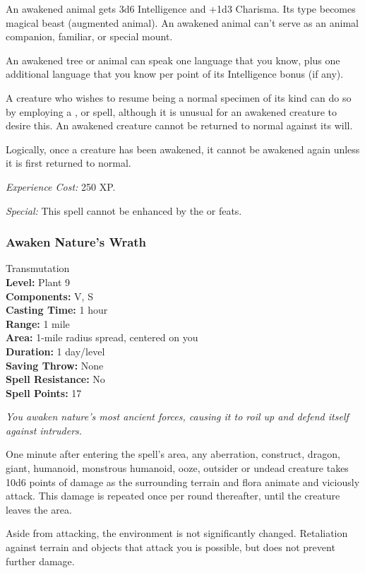 An awakened animal gets 3d6 Intelligence and +1d3 Charisma. Its type becomes magical beast (augmented animal). 
An awakened animal can't serve as an animal companion, familiar, or special mount.

An awakened tree or animal can speak one language that you know, plus one additional language that you know per point of its Intelligence bonus (if any).

A creature who wishes to resume being a normal specimen of its kind can do so by employing a ,  or  spell, although it is unusual for an awakened creature to desire this. An awakened creature cannot be returned to normal against its will.

Logically, once a creature has been awakened, it cannot be awakened again unless it is first returned to normal.

\emph{Experience Cost:} 250 XP.

\emph{Special:} This spell cannot be enhanced by the  or  feats.
\subsubsection{Awaken Nature's Wrath}
\label{Spell:AwakenNaturesWrath}
Transmutation
\\ \textbf{Level:} Plant 9
\\ \textbf{Components:} V, S
\\ \textbf{Casting Time:} 1 hour
\\ \textbf{Range:} 1 mile
\\ \textbf{Area:} 1-mile radius spread, centered on you
\\ \textbf{Duration:} 1 day/level
\\ \textbf{Saving Throw:} None
\\ \textbf{Spell Resistance:} No
\\ \textbf{Spell Points:} 17

\emph{You awaken nature's most ancient forces, causing it to roil up and defend itself against intruders.}

One minute after entering the spell's area, any aberration, construct, dragon, giant, humanoid, monstrous humanoid, ooze, outsider or undead creature takes 10d6 points of damage as the surrounding terrain and flora animate and viciously attack. This damage is repeated once per round thereafter, until the creature leaves the area. 

Aside from attacking, the environment is not significantly changed. Retaliation against terrain and objects that attack you is possible, but does not prevent further damage.

